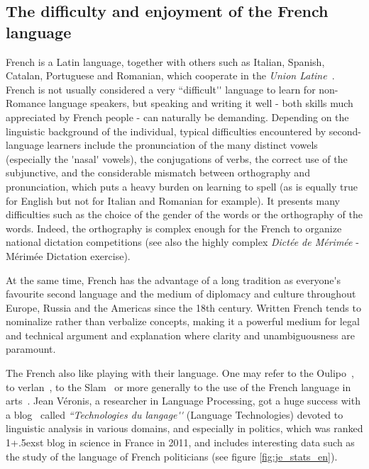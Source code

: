 \documentclass[]{../metanetpaper}
\begin{document}
\begin{multicols}{2}
\subsection{The difficulty and enjoyment of the French language}
French is a Latin language, together with others such as Italian,
Spanish, Catalan, Portuguese and Romanian, which cooperate in the
{\em Union Latine}~\cite{ulatine}. French is not usually considered a very ``difficult{\mbox '}{\mbox '}
language to learn for non-Romance language speakers, but speaking and
writing it well - both skills much appreciated by French people - can
naturally be demanding. Depending on the linguistic background of the
individual, typical difficulties encountered by second-language
learners include the pronunciation of the many distinct vowels
(especially the {\mbox '}nasal{\mbox '} vowels), the conjugations of verbs, the
correct use of the subjunctive, and the considerable mismatch between
orthography and pronunciation, which puts a heavy burden on learning
to spell (as is equally true for English but not for Italian and
Romanian for example). It presents many difficulties such as the
choice of the gender of the words or the orthography of the
words. Indeed, the orthography is complex enough for the French to
organize national dictation competitions (see also the highly complex
{\em Dictée de Mérimée} - Mérimée Dictation exercise).  

At the same time, French has the advantage of a long tradition as
everyone{\mbox '}s favourite second language and the medium of diplomacy and
culture throughout Europe, Russia and the Americas since the 18th
century. Written French tends to nominalize rather than verbalize
concepts, making it a powerful medium for legal and technical argument
and explanation where clarity and unambiguousness are paramount.

The French also like playing with their language. One may refer to the
Oulipo~\cite{oulipo}, to verlan~\cite{plenat95}, to the Slam~\cite{slam} or more generally to the use of the
French language in arts~\cite{arts}. Jean Véronis, a researcher in Language
Processing, got a huge success with a blog~\cite{veronis} called {\em ``Technologies du
langage{\mbox '}{\mbox '}} (Language Technologies) devoted to linguistic analysis in various domains, and
especially in politics, which was ranked 1\raise+.5ex\hbox{st} blog in science in France
in 2011, and includes interesting data such as the study of the
language of French politicians (see figure \ref{fig:je_stats_en}).


\end{multicols}
\end{document}
